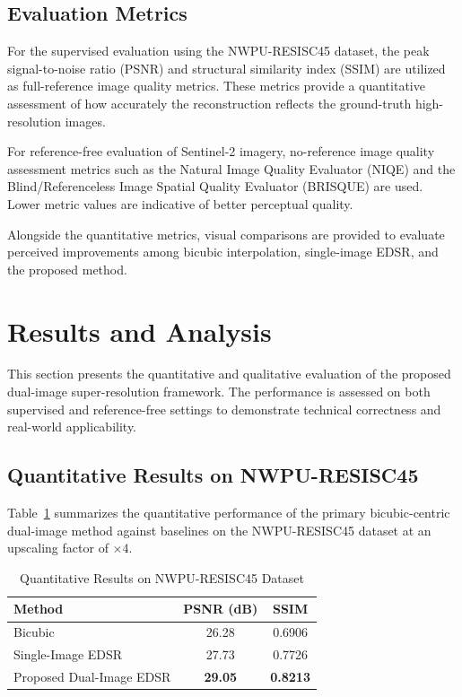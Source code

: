 \documentclass[conference]{IEEEtran}
\begin{document}
\subsection{Evaluation Metrics}

For the supervised evaluation using the NWPU-RESISC45 dataset, the peak signal-to-noise ratio (PSNR) and structural similarity index (SSIM) are utilized as full-reference image quality metrics. These metrics provide a quantitative assessment of how accurately the reconstruction reflects the ground-truth high-resolution images. 

For reference-free evaluation of Sentinel-2 imagery, no-reference image quality assessment metrics such as the Natural Image Quality Evaluator (NIQE) and the Blind/Referenceless Image Spatial Quality Evaluator (BRISQUE) are used. Lower metric values are indicative of better perceptual quality. 

Alongside the quantitative metrics, visual comparisons are provided to evaluate perceived improvements among bicubic interpolation, single-image EDSR, and the proposed method.

\section{Results and Analysis}

This section presents the quantitative and qualitative evaluation of the proposed dual-image super-resolution framework. The performance is assessed on both supervised and reference-free settings to demonstrate technical correctness and real-world applicability.

\subsection{Quantitative Results on NWPU-RESISC45}

Table~\ref{tab:nwpu_results} summarizes the quantitative performance of the primary bicubic-centric dual-image method against baselines on the NWPU-RESISC45 dataset at an upscaling factor of $\times4$.

\begin{table}[t]
\centering
\caption{Quantitative Results on NWPU-RESISC45 Dataset}
\label{tab:nwpu_results}
\begin{tabular}{lcc}
\toprule
Method & PSNR (dB) & SSIM \\
\midrule
Bicubic & 26.28 & 0.6906 \\
Single-Image EDSR & 27.73 & 0.7726 \\
Proposed Dual-Image EDSR & \textbf{29.05} & \textbf{0.8213} \\
\bottomrule
\end{tabular}
\end{table}
\end{document}

